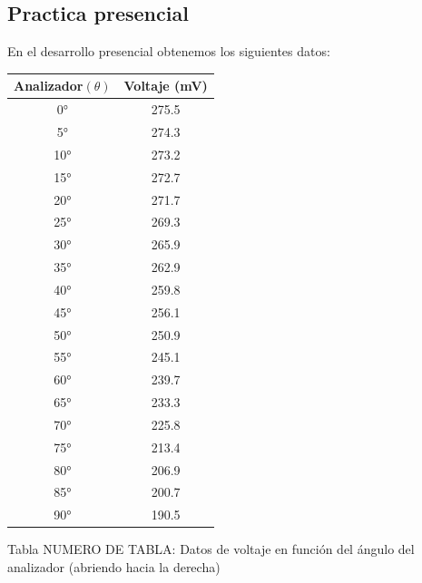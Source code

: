 \documentclass{article}
\begin{document}
\begin{multicols}{2}
\begin{itemize}
	\end{itemize}
	\subsection*{Practica presencial}
	En el desarrollo presencial obtenemos los siguientes datos:
	\begin{table}[h]
		\centering
		\begin{tabular}{|c|c|}
			\hline
			
	Analizador$(\theta)$& Voltaje (mV) \\
			\hline
			0°   & 275.5 \\
			5°   & 274.3 \\
			10°  & 273.2 \\
			15°  & 272.7 \\
			20°  & 271.7 \\
			25°  & 269.3 \\
			30°  & 265.9 \\
			35°  & 262.9 \\
			40°  & 259.8 \\
			45°  & 256.1 \\
			50°  & 250.9 \\
			55°  & 245.1 \\
			60°  & 239.7 \\
			65°  & 233.3 \\
			70°  & 225.8 \\
			75°  & 213.4 \\
			80°  & 206.9 \\
			85°  & 200.7 \\
			90°  & 190.5 \\
			\hline
		\end{tabular}
	\end{table}
	
	\begin{center}
	Tabla NUMERO DE TABLA: Datos de voltaje en función del ángulo del analizador (abriendo hacia la derecha)
	\end{center}
	

\end{multicols}
\end{document}

